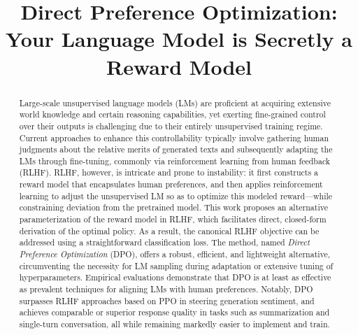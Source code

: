 \title{Direct Preference Optimization: Your Language Model is Secretly a Reward Model}

\begin{abstract}
Large-scale unsupervised language models (LMs) are proficient at acquiring extensive world knowledge and certain reasoning capabilities, yet exerting fine-grained control over their outputs is challenging due to their entirely unsupervised training regime. Current approaches to enhance this controllability typically involve gathering human judgments about the relative merits of generated texts and subsequently adapting the LMs through fine-tuning, commonly via reinforcement learning from human feedback (RLHF). RLHF, however, is intricate and prone to instability: it first constructs a reward model that encapsulates human preferences, and then applies reinforcement learning to adjust the unsupervised LM so as to optimize this modeled reward—while constraining deviation from the pretrained model. This work proposes an alternative parameterization of the reward model in RLHF, which facilitates direct, closed-form derivation of the optimal policy. As a result, the canonical RLHF objective can be addressed using a straightforward classification loss. The method, named \textit{Direct Preference Optimization} (DPO), offers a robust, efficient, and lightweight alternative, circumventing the necessity for LM sampling during adaptation or extensive tuning of hyperparameters. Empirical evaluations demonstrate that DPO is at least as effective as prevalent techniques for aligning LMs with human preferences. Notably, DPO surpasses RLHF approaches based on PPO in steering generation sentiment, and achieves comparable or superior response quality in tasks such as summarization and single-turn conversation, all while remaining markedly easier to implement and train.
\end{abstract}

